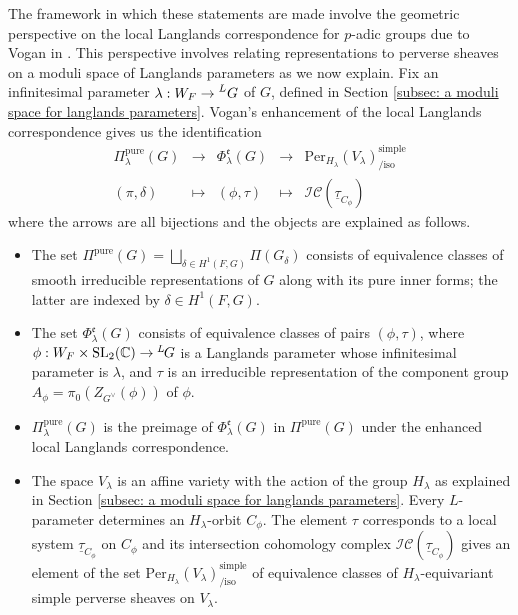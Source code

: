 \documentclass[11pt,letterpaper]{amsart}
\newcommand{\SL}{\mathrm{SL}}
\newcommand{\dualgroup}[1]{{#1}^\vee}
\newcommand{\Lgroup}[1]{{\hskip-2 pt \,^L\hskip-1pt{#1}}}
\newcommand{\pure}{\mathrm{pure}}
\newcommand{\Per}{\mathrm{Per}}
\newcommand{\locsys}[2]{\underline{#1}_{#2}}
\newcommand{\CC}{\mathbb{C}}
\renewcommand{\1}{\mathbbm{1}}
\numberwithin{equation}{section}
\begin{document}
The framework in which these statements are made involve the geometric perspective on the local Langlands correspondence for $p$-adic groups due to Vogan in \cite{Vog93}. This perspective involves relating representations to perverse sheaves on a moduli space of Langlands parameters as we now explain. Fix an infinitesimal parameter $\lambda:W_F \to \prescript{L}{}{G}$ of $G$, defined in Section \ref{subsec: a moduli space for langlands parameters}. Vogan's enhancement of the local Langlands correspondence gives us the identification
\[
\begin{array}{ccccc}
\Pi_\lambda^\pure(G) &{\longrightarrow} &\Phi^{\mathfrak{e}}_\lambda(G) & {\longrightarrow} &  \Per_{H_\lambda}(V_\lambda)^{\mathrm{simple}}_{\mathrm{/iso}} \\
(\pi,\delta) & {\longmapsto} & (\phi, \tau) & {\longmapsto} & \mathcal{IC}(\locsys{\tau}{C_\phi}) 
\end{array}
\]
where the arrows are all bijections and the objects are explained as follows.
\begin{itemize}
    \item The set $ {\Pi^\pure(G)}=\bigsqcup_{\delta\in H^1(F,G)}\Pi(G_\delta)$ consists of equivalence classes of smooth irreducible representations of $G$ along with its pure inner forms; the latter are indexed by $\delta\in H^1(F,G)$.
    \item The set $\Phi^{\mathfrak{e}}_\lambda(G)$ consists of equivalence classes of pairs $(\phi,\tau)$, where $\phi:W_F\times \SL_2(\CC)\to \Lgroup{G}$ is a Langlands parameter whose infinitesimal parameter is $\lambda$, and $\tau$ is an irreducible representation of the component group $A_\phi=\pi_0(Z_{\dualgroup{G}}(\phi))$ of $\phi$. 
    \item $ {\Pi^\pure_\lambda(G)}$ is the preimage of $ {\Phi^{\mathfrak{e}}_\lambda(G)}$ in $ {\Pi^\pure(G)}$ under the enhanced local Langlands correspondence.
    \item The space $V_\lambda$ is an affine variety with the action of the group $H_\lambda$ as explained in Section \ref{subsec: a moduli space for langlands parameters}. Every $L$-parameter determines an $H_\lambda$-orbit $C_\phi$. The element $\tau$ corresponds to a local system $\locsys{\tau}{C_\phi}$ on $C_\phi$ and its intersection cohomology complex $\mathcal{IC}(\locsys{\tau}{C_\phi})$ gives an element of  the set $\Per_{H_\lambda}(V_\lambda)^{\mathrm{simple}}_{\mathrm{/iso}}$ of equivalence classes of $H_\lambda$-equivariant simple perverse sheaves on $V_\lambda$. 
\end{itemize}
\end{document}
